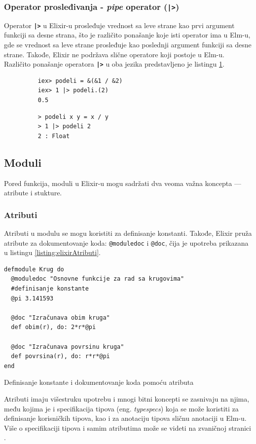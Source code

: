 \documentclass[12pt,oneside]{memoir}
\begin{document}
\subsubsection{Operator prosleđivanja - \emph{pipe} operator (\texttt{\textbf{|>}})}
Operator \texttt{\textbf{|>}} u Elixir-u prosleđuje vrednost sa leve strane kao prvi argument
funkciji sa desne strana, što je različito ponašanje koje isti operator ima u Elm-u, gde se
vrednost sa leve strane prosleđuje kao poslednji argument funkciji sa desne
strane. Takođe, Elixir ne podržava slične operatore koji postoje u Elm-u. Različito ponašanje
operatora \texttt{\textbf{|>}} u oba jezika predstavljeno je listingu \ref{listing:elixirPipe}.
\begin{figure}[!h]
\begin{minipage}{0.5\textwidth}
  \centering
  \begin{verbatim}
    iex> podeli = &(&1 / &2)
    iex> 1 |> podeli.(2)
    0.5
  \end{verbatim}
\end{minipage}
\begin{minipage}{0.5\textwidth}
  \centering
  \begin{verbatim}
    > podeli x y = x / y
    > 1 |> podeli 2
    2 : Float
  \end{verbatim}
\end{minipage}
\label{listing:elixirPipe}
\end{figure}
\subsection{Moduli}
Pored funkcija, moduli u Elixir-u mogu sadržati dva veoma važna koncepta --- atribute i
stukture.
\subsubsection{Atributi}
Atributi u modulu se mogu koristiti za definisanje konstanti. Takođe, Elixir pruža atribute
za dokumentovanje koda: \texttt{@moduledoc} i \texttt{@doc}, čija je upotreba prikazana u
listingu \ref{listing:elixirAtributi}.
\begin{listing}[!h]
\begin{verbatim}
defmodule Krug do
  @moduledoc "Osnovne funkcije za rad sa krugovima"
  #definisanje konstante
  @pi 3.141593 

  @doc "Izračunava obim kruga"
  def obim(r), do: 2*r*@pi

  @doc "Izračunava povrsinu kruga"
  def povrsina(r), do: r*r*@pi
end
\end{verbatim}
\caption{Definisanje konstante i dokumentovanje koda pomoću atributa}
\label{listing:elixirAtributi}
\end{listing}
Atributi imaju višestruku upotrebu i mnogi bitni koncepti se zasnivaju na njima, među kojima
je i specifikacija tipova (eng. \emph{typespecs}) koja se može koristiti za definisanje
korisničkih tipova, kao i za anotaciju tipova sličnu anotaciji u Elm-u. Više o specifikaciji
tipova i samim atributima može se videti na zvaničnoj stranici \cite{elixir}.
\end{document}
